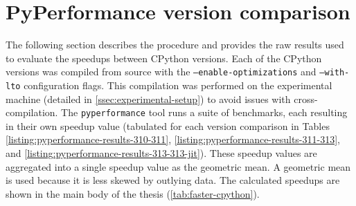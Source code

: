 \chapter{PyPerformance version comparison}
\label{chap:pyperformance-version-comparison}

The following section describes the procedure and provides the raw results used to evaluate the speedups between CPython versions.
Each of the CPython versions was compiled from source with the \texttt{--enable-optimizations} and \texttt{--with-lto} configuration flags. This compilation was performed on the experimental machine (detailed in \autoref{ssec:experimental-setup}) to avoid issues with cross-compilation.
The \texttt{pyperformance} tool runs a suite of benchmarks, each resulting in their own speedup value (tabulated for each version comparison in Tables \ref{listing:pyperformance-results-310-311}, \ref{listing:pyperformance-results-311-313}, and \ref{listing:pyperformance-results-313-313-jit}). These speedup values are aggregated into a single speedup value as the geometric mean. %
A geometric mean is used because it is less skewed by outlying data. %
The calculated speedups are shown in the main body of the thesis (\autoref{tab:faster-cpython}).

\vspace{2em}


\vspace{2em}

